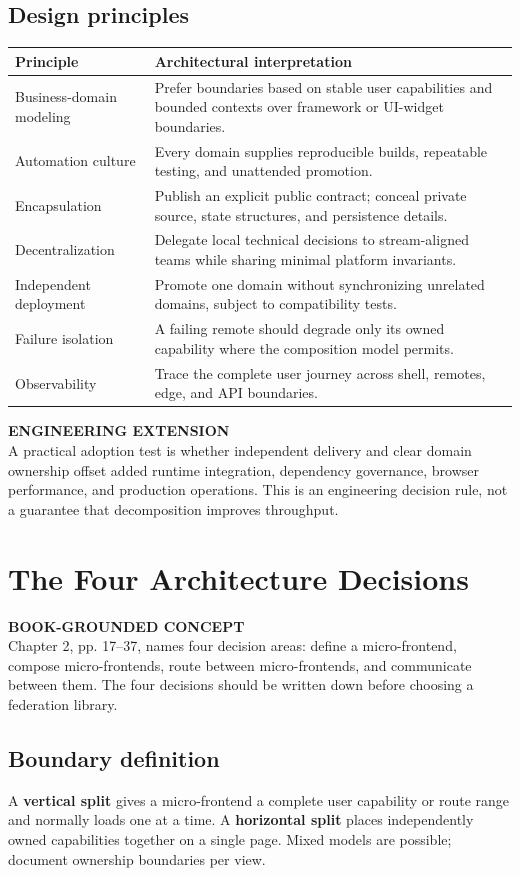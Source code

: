 \documentclass[11pt,letterpaper,oneside]{report}
\newcommand{\based}[1]{\begin{sourcebox}\textbf{BOOK-GROUNDED CONCEPT}\\#1\end{sourcebox}}
\newcommand{\added}[1]{\begin{engineerbox}\textbf{ENGINEERING EXTENSION}\\#1\end{engineerbox}}
\newcommand{\term}[1]{\textbf{\color{navy}#1}}
\begin{document}
\section{Design principles}
\begin{longtable}{>{\raggedright\arraybackslash}p{.27\linewidth}>{\raggedright\arraybackslash}p{.65\linewidth}}\toprule Principle & Architectural interpretation \\\midrule
Business-domain modeling & Prefer boundaries based on stable user capabilities and bounded contexts over framework or UI-widget boundaries.\\
Automation culture & Every domain supplies reproducible builds, repeatable testing, and unattended promotion.\\
Encapsulation & Publish an explicit public contract; conceal private source, state structures, and persistence details.\\
Decentralization & Delegate local technical decisions to stream-aligned teams while sharing minimal platform invariants.\\
Independent deployment & Promote one domain without synchronizing unrelated domains, subject to compatibility tests.\\
Failure isolation & A failing remote should degrade only its owned capability where the composition model permits.\\
Observability & Trace the complete user journey across shell, remotes, edge, and API boundaries.\\\bottomrule\end{longtable}
\added{A practical adoption test is whether independent delivery and clear domain ownership offset added runtime integration, dependency governance, browser performance, and production operations. This is an engineering decision rule, not a guarantee that decomposition improves throughput.}
\chapter{The Four Architecture Decisions}
\based{Chapter 2, pp. 17--37, names four decision areas: define a micro-frontend, compose micro-frontends, route between micro-frontends, and communicate between them. The four decisions should be written down before choosing a federation library.}
\section{Boundary definition}
A \term{vertical split} gives a micro-frontend a complete user capability or route range and normally loads one at a time. A \term{horizontal split} places independently owned capabilities together on a single page. Mixed models are possible; document ownership boundaries per view.
\end{document}

